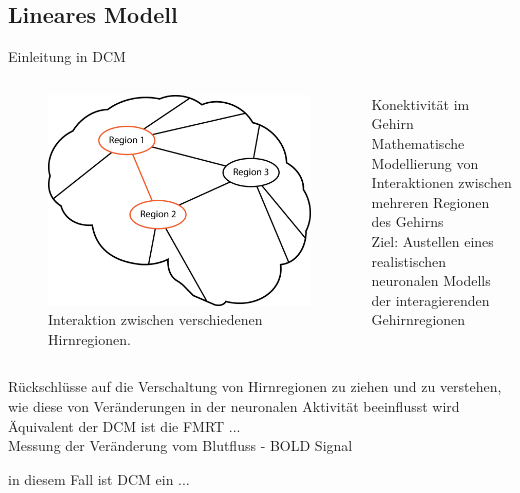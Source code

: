 \documentclass{beamer}
\begin{document}
\subsection{Lineares Modell}
	\begin{frame}{Einleitung in DCM}
		\begin{columns}
		\column[t]{6cm}
		\begin{figure}
			\centering
			\includegraphics[width=0.85\linewidth]{res/brain_01.eps}
			\caption{Interaktion zwischen verschiedenen Hirnregionen.}
			\label{fig:brain_01}
		\end{figure}
		\column[t]{6cm}
		Konektivität im Gehirn\\
		Mathematische Modellierung von Interaktionen zwischen mehreren Regionen des Gehirns\\
		\vspace{0.5cm}
		Ziel: Austellen eines realistischen neuronalen Modells der interagierenden Gehirnregionen
		\end{columns}
	\end{frame}
	
	\begin{frame}
		Rückschlüsse auf die Verschaltung von Hirnregionen zu ziehen und zu verstehen, wie diese von Veränderungen in der neuronalen Aktivität beeinflusst wird\\
		Äquivalent der DCM ist die FMRT ...\\
		\vfill
		Messung der Veränderung vom Blutfluss - BOLD Signal
	\end{frame}
	
	\begin{frame}
		in diesem Fall ist DCM ein ...
	\end{frame}
	
\end{document}
